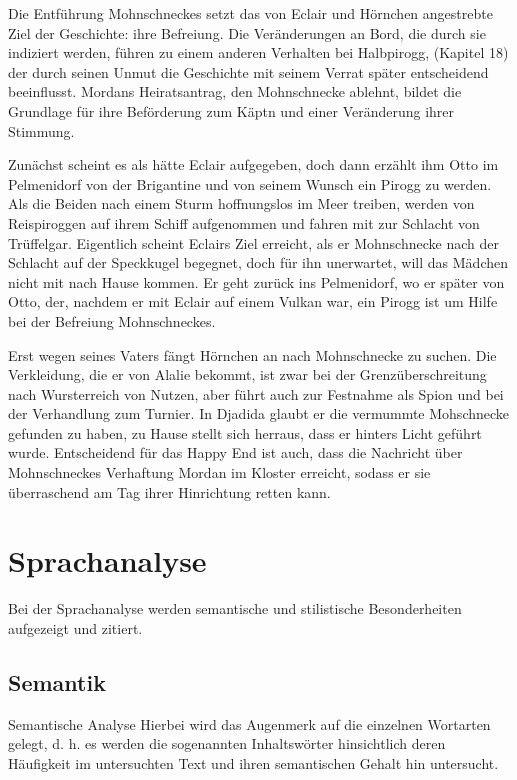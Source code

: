 {Die Entführung Mohnschneckes setzt das von Eclair und Hörnchen angestrebte Ziel der Geschichte: ihre Befreiung.  Die Veränderungen an Bord, die durch sie indiziert werden, führen zu einem anderen Verhalten bei Halbpirogg, (Kapitel 18) der durch seinen Unmut die Geschichte mit seinem Verrat später entscheidend beeinflusst. Mordans Heiratsantrag, den Mohnschnecke ablehnt, bildet die Grundlage für ihre Beförderung zum Käptn und einer Veränderung ihrer Stimmung. 

Zunächst scheint es als hätte Eclair aufgegeben, doch dann erzählt ihm Otto im Pelmenidorf von der Brigantine und von seinem Wunsch ein Pirogg zu werden. Als die Beiden nach einem Sturm hoffnungslos im Meer treiben, werden von Reispiroggen auf ihrem Schiff aufgenommen und fahren mit zur Schlacht von Trüffelgar. Eigentlich scheint Eclairs Ziel erreicht, als er Mohnschnecke nach der Schlacht auf der Speckkugel begegnet, doch für ihn unerwartet, will das Mädchen nicht mit nach Hause kommen. Er geht zurück ins Pelmenidorf, wo er später von Otto, der, nachdem er mit Eclair auf einem Vulkan war, ein Pirogg ist um Hilfe bei der Befreiung Mohnschneckes.

Erst wegen seines Vaters fängt Hörnchen an nach Mohnschnecke zu suchen. Die Verkleidung, die er von Alalie bekommt, ist zwar bei der Grenzüberschreitung nach Wursterreich von Nutzen, aber führt auch zur Festnahme als Spion und bei der Verhandlung zum Turnier. In Djadida glaubt er die vermummte Mohschnecke gefunden zu haben, zu Hause stellt sich herraus, dass er hinters Licht geführt wurde. 
Entscheidend für das Happy End ist auch, dass die Nachricht über Mohnschneckes Verhaftung Mordan im Kloster erreicht, sodass er sie überraschend am Tag ihrer Hinrichtung retten kann.


\section{Sprachanalyse}
 Bei der Sprachanalyse werden semantische und stilistische Besonderheiten aufgezeigt und zitiert.

\subsection{Semantik}

Semantische Analyse
Hierbei wird das Augenmerk auf die einzelnen Wortarten gelegt, d. h. es werden die sogenannten Inhaltswörter hinsichtlich deren Häufigkeit im untersuchten Text und ihren semantischen Gehalt hin untersucht. 

}
